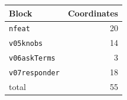 \begin{tabular}{lr}
\toprule
Block & Coordinates \\
\midrule
\texttt{nfeat} & 20 \\
\texttt{v05knobs} & 14 \\
\texttt{v06askTerms} & 3 \\
\texttt{v07responder} & 18 \\
\midrule
total & 55 \\
\bottomrule
\end{tabular}
